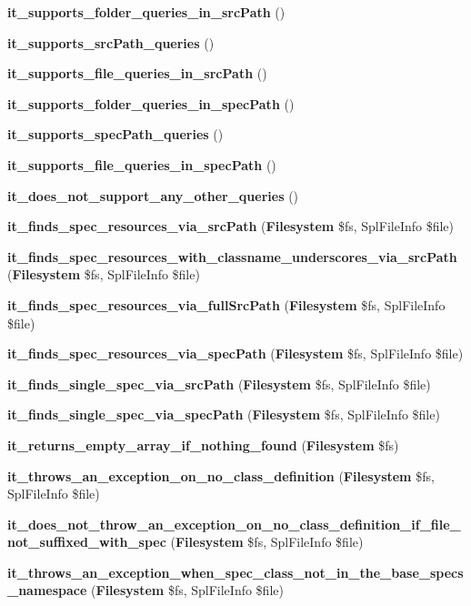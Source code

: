 \begin{DoxyCompactItemize}
\item 
{\bf it\+\_\+supports\+\_\+folder\+\_\+queries\+\_\+in\+\_\+src\+Path} ()
\item 
{\bf it\+\_\+supports\+\_\+src\+Path\+\_\+queries} ()
\item 
{\bf it\+\_\+supports\+\_\+file\+\_\+queries\+\_\+in\+\_\+src\+Path} ()
\item 
{\bf it\+\_\+supports\+\_\+folder\+\_\+queries\+\_\+in\+\_\+spec\+Path} ()
\item 
{\bf it\+\_\+supports\+\_\+spec\+Path\+\_\+queries} ()
\item 
{\bf it\+\_\+supports\+\_\+file\+\_\+queries\+\_\+in\+\_\+spec\+Path} ()
\item 
{\bf it\+\_\+does\+\_\+not\+\_\+support\+\_\+any\+\_\+other\+\_\+queries} ()
\item 
{\bf it\+\_\+finds\+\_\+spec\+\_\+resources\+\_\+via\+\_\+src\+Path} ({\bf Filesystem} \$fs, Spl\+File\+Info \$file)
\item 
{\bf it\+\_\+finds\+\_\+spec\+\_\+resources\+\_\+with\+\_\+classname\+\_\+underscores\+\_\+via\+\_\+src\+Path} ({\bf Filesystem} \$fs, Spl\+File\+Info \$file)
\item 
{\bf it\+\_\+finds\+\_\+spec\+\_\+resources\+\_\+via\+\_\+full\+Src\+Path} ({\bf Filesystem} \$fs, Spl\+File\+Info \$file)
\item 
{\bf it\+\_\+finds\+\_\+spec\+\_\+resources\+\_\+via\+\_\+spec\+Path} ({\bf Filesystem} \$fs, Spl\+File\+Info \$file)
\item 
{\bf it\+\_\+finds\+\_\+single\+\_\+spec\+\_\+via\+\_\+src\+Path} ({\bf Filesystem} \$fs, Spl\+File\+Info \$file)
\item 
{\bf it\+\_\+finds\+\_\+single\+\_\+spec\+\_\+via\+\_\+spec\+Path} ({\bf Filesystem} \$fs, Spl\+File\+Info \$file)
\item 
{\bf it\+\_\+returns\+\_\+empty\+\_\+array\+\_\+if\+\_\+nothing\+\_\+found} ({\bf Filesystem} \$fs)
\item 
{\bf it\+\_\+throws\+\_\+an\+\_\+exception\+\_\+on\+\_\+no\+\_\+class\+\_\+definition} ({\bf Filesystem} \$fs, Spl\+File\+Info \$file)
\item 
{\bf it\+\_\+does\+\_\+not\+\_\+throw\+\_\+an\+\_\+exception\+\_\+on\+\_\+no\+\_\+class\+\_\+definition\+\_\+if\+\_\+file\+\_\+not\+\_\+suffixed\+\_\+with\+\_\+spec} ({\bf Filesystem} \$fs, Spl\+File\+Info \$file)
\item 
{\bf it\+\_\+throws\+\_\+an\+\_\+exception\+\_\+when\+\_\+spec\+\_\+class\+\_\+not\+\_\+in\+\_\+the\+\_\+base\+\_\+specs\+\_\+namespace} ({\bf Filesystem} \$fs, Spl\+File\+Info \$file)

\end{DoxyCompactItemize}
